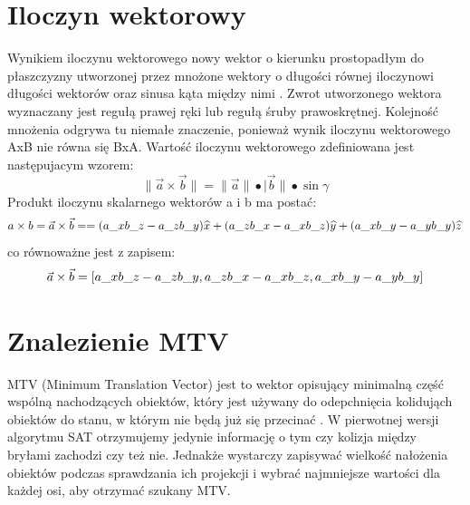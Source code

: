 \section{Iloczyn wektorowy}
Wynikiem iloczynu wektorowego nowy wektor o kierunku prostopadłym do płaszczyzny utworzonej przez mnożone wektory o długości równej iloczynowi długości wektorów oraz sinusa kąta między nimi \cite{math1}. Zwrot utworzonego wektora wyznaczany jest regułą prawej ręki lub regułą śruby prawoskrętnej. Kolejność mnożenia odgrywa tu niemałe znaczenie, ponieważ wynik iloczynu wektorowego AxB nie równa się BxA.
Wartość iloczynu wektorowego zdefiniowana jest następujacym wzorem: \\
\begin{equation}\|\vec{a}\times\vec{b}\|=\|\vec{a}\|\bullet|\vec{b}\|\bullet\sin\gamma\end{equation}
Produkt iloczynu skalarnego wektorów a i b ma postać: \\
\begin{equation}
\centering
a \times b=\vec{a}\times\vec{b}=
=(a\_{x}b\_{z}-a\_{z}b\_{y})\widehat{x}+(a\_{z}b\_{x}-a\_{x}b\_{z})\widehat{y}+(a\_{x}b\_{y}-a\_{y}b\_{y})\widehat{z}
\end{equation}
co równoważne jest z zapisem: \\
\begin{equation}
\centering
\vec{a}\times\vec{b}=[a\_{x}b\_{z}-a\_{z}b\_{y},a\_{z}b\_{x}-a\_{x}b\_{z},a\_{x}b\_{y}-a\_{y}b\_{y}]
\end{equation}
\section{Znalezienie MTV}
MTV (Minimum Translation Vector) jest to wektor opisujący minimalną część wspólną nachodzących obiektów, który jest używany do odepchnięcia kolidująch obiektów do stanu, w którym nie będą już się przecinać \cite{SAT}. W pierwotnej wersji algorytmu SAT otrzymujemy jedynie informację o tym czy kolizja między bryłami zachodzi czy też nie. Jednakże wystarczy zapisywać wielkość nałożenia obiektów podczas sprawdzania ich projekcji i wybrać najmniejsze wartości dla każdej osi, aby otrzymać szukany MTV.


